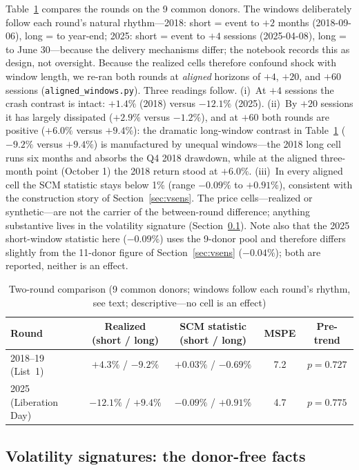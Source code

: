 \documentclass[11pt,a4paper]{article}
\begin{document}
Table~\ref{tab:tworound} compares the rounds on the 9 common donors. The
windows deliberately follow each round's natural rhythm---2018: short =
event to $+2$ months (2018-09-06), long = to year-end; 2025: short =
event to $+4$ sessions (2025-04-08), long = to June 30---because the
delivery mechanisms differ; the notebook records this as design, not
oversight. Because the realized cells therefore confound shock with
window length, we re-ran both rounds at \emph{aligned} horizons of $+4$,
$+20$, and $+60$ sessions (\texttt{aligned\_windows.py}). Three readings
follow. (i)~At $+4$ sessions the crash contrast is intact: $+1.4\%$
(2018) versus $-12.1\%$ (2025). (ii)~By $+20$ sessions it has largely
dissipated ($+2.9\%$ versus $-1.2\%$), and at $+60$ both rounds are
positive ($+6.0\%$ versus $+9.4\%$): the dramatic long-window contrast in
Table~\ref{tab:tworound} ($-9.2\%$ versus $+9.4\%$) is
manufactured by unequal windows---the 2018 long cell runs six months and
absorbs the Q4 2018 drawdown, while at the aligned three-month point
(October 1) the 2018 return stood at $+6.0\%$. (iii)~In every aligned
cell the SCM statistic stays below 1\% (range $-0.09\%$ to $+0.91\%$),
consistent with the construction story of Section~\ref{sec:vsens}. The
price cells---realized or synthetic---are not the carrier of the
between-round difference; anything substantive lives in the volatility
signature (Section~\ref{sec:garch}). Note also that the 2025 short-window
statistic here ($-0.09\%$) uses the 9-donor pool and therefore differs
slightly from the 11-donor figure of Section~\ref{sec:vsens}
($-0.04\%$); both are reported, neither is an effect.

\begin{table}[htbp]
\centering
\caption{Two-round comparison (9 common donors; windows follow each
round's rhythm, see text; descriptive---no cell is an effect)}
\label{tab:tworound}
\small
\setlength{\tabcolsep}{4pt}
\begin{tabular}{@{}lcccc@{}}
\toprule
Round & Realized (short / long) & SCM statistic (short / long) & MSPE &
Pre-trend \\
\midrule
2018--19 (List~1) & $+4.3\%$ / $-9.2\%$ & $+0.03\%$ / $-0.69\%$ & 7.2
& $p=0.727$ \\
2025 (Liberation Day) & $-12.1\%$ / $+9.4\%$ & $-0.09\%$ / $+0.91\%$ & 4.7
& $p=0.775$ \\
\bottomrule
\end{tabular}
\end{table}

\subsection{Volatility signatures: the donor-free facts}\label{sec:garch}
\end{document}
